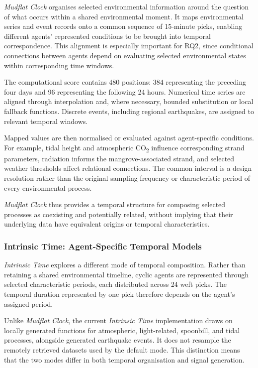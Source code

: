 \documentclass[manuscript,review,anonymous]{acmart}
\begin{document}
\emph{Mudflat Clock} organises selected environmental information around the question of what occurs within a shared environmental moment. It maps environmental series and event records onto a common sequence of 15-minute picks, enabling different agents' represented conditions to be brought into temporal correspondence. This alignment is especially important for RQ2, since conditional connections between agents depend on evaluating selected environmental states within corresponding time windows.

The computational score contains 480 positions: 384 representing the preceding four days and 96 representing the following 24 hours. Numerical time series are aligned through interpolation and, where necessary, bounded substitution or local fallback functions. Discrete events, including regional earthquakes, are assigned to relevant temporal windows.

Mapped values are then normalised or evaluated against agent-specific conditions. For example, tidal height and atmospheric CO\textsubscript{2} influence corresponding strand parameters, radiation informs the mangrove-associated strand, and selected weather thresholds affect relational connections. The common interval is a design resolution rather than the original sampling frequency or characteristic period of every environmental process.

\emph{Mudflat Clock} thus provides a temporal structure for composing selected processes as coexisting and potentially related, without implying that their underlying data have equivalent origins or temporal characteristics.

\subsubsection{Intrinsic Time: Agent-Specific Temporal Models}

\emph{Intrinsic Time} explores a different mode of temporal composition. Rather than retaining a shared environmental timeline, cyclic agents are represented through selected characteristic periods, each distributed across 24 weft picks. The temporal duration represented by one pick therefore depends on the agent's assigned period.

Unlike \emph{Mudflat Clock}, the current \emph{Intrinsic Time} implementation draws on locally generated functions for atmospheric, light-related, spoonbill, and tidal processes, alongside generated earthquake events. It does not resample the remotely retrieved datasets used by the default mode. This distinction means that the two modes differ in both temporal organisation and signal generation.
\end{document}
